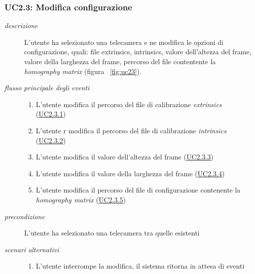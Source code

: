 \subsubsection{UC2.3: Modifica configurazione} \label{sec:uc2.3}
\begin{description}
 \item[\em{descrizione}] L'utente ha selezionato una telecamera e ne modifica le opzioni di configurazione, quali: file extrinsics, intrinsics, valore dell'altezza del frame, valore della larghezza del frame, percorso del file contentente la \textit{homography matrix} (figura ~\ref{fig:uc23}).
 
\item[\em{flusso principale degli eventi}] \mbox{}
 \begin{enumerate}
	\item L'utente modifica il percorso del file di calibrazione \textit{extrinsics} (\hyperref[sec:uc2.3.1]{UC2.3.1})
	\item L'utente r modifica il percorso del file di calibrazione \textit{intrinsics} (\hyperref[sec:uc2.3.2]{UC2.3.2})
	\item L'utente modifica il valore dell'altezza del frame (\hyperref[sec:uc2.3.3]{UC2.3.3})
	\item L'utente modifica il valore della larghezza del frame (\hyperref[sec:uc2.3.4]{UC2.3.4})
		\item L'utente modifica il percorso del file di configurazione contenente la \textit{homography matrix} (\hyperref[sec:uc2.3.5]{UC2.3.5})
\end{enumerate}    
 
  \item[\em{precondizione}] L'utente ha selezionato una telecamera tra quelle esistenti
  
\item[\em{scenari alternativi}]  \mbox{}
    \begin{enumerate} 
  \item L'utente interrompe la modifica, il sistema ritorna in attesa di eventi
  \end{enumerate}   
 \end{description}
